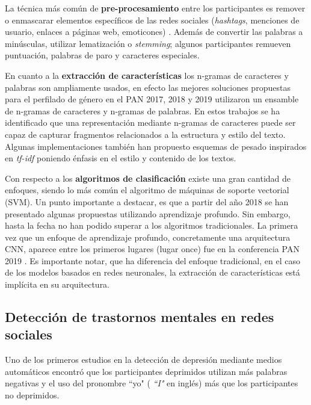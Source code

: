 La técnica más común de \textbf{pre-procesamiento} entre los participantes es remover o enmascarar elementos específicos de las redes sociales (\textit{hashtags}, menciones de usuario, enlaces a páginas web, emoticones) \citep{daneshvar2018gender, jimenez2019bots, Pizarro2019}. Además de convertir las palabras a minúsculas, utilizar lematización  o \textit{stemming}; algunos participantes remueven puntuación, palabras de paro y caracteres especiales.

En cuanto a la \textbf{extracción de características} los n-gramas de caracteres y palabras son ampliamente usados, en efecto las mejores soluciones propuestas para el perfilado de género en el PAN 2017, 2018 y 2019 \citep{basile2017there, daneshvar2018gender, Pizarro2019} utilizaron un ensamble de n-gramas de caracteres y n-gramas de palabras. En estos trabajos se ha identificado que una representación mediante n-gramas de caracteres puede ser capaz de capturar fragmentos relacionados a la estructura y estilo del texto. Algunas implementaciones también han propuesto esquemas de pesado inspirados en \textit{tf-idf} poniendo énfasis en el estilo y contenido de los textos.


Con respecto a los \textbf{algoritmos de clasificación} existe una gran cantidad de enfoques, siendo lo más común el algoritmo de máquinas de soporte vectorial (SVM). Un punto importante a destacar, es que a partir del año 2018 se han presentado algunas propuestas utilizando aprendizaje profundo. Sin embargo, hasta la fecha no han podido superar a los algoritmos tradicionales. 
La primera vez que un enfoque de aprendizaje profundo, concretamente una arquitectura CNN, aparece entre los primeros lugares (lugar once) fue en la conferencia PAN 2019 \citep{Rangel2019}. Es importante notar, que ha diferencia del enfoque tradicional, en el caso de los modelos basados en redes neuronales, la extracción de características está implícita en su arquitectura.

\subsection{Detección de trastornos mentales en redes sociales}
Uno de los primeros estudios en la detección de depresión mediante medios automáticos \citep{rude2004language} encontró que los participantes deprimidos utilizan más palabras negativas y el uso del pronombre ``yo" ( \textit{``I"} en inglés) más que los participantes no deprimidos. 

